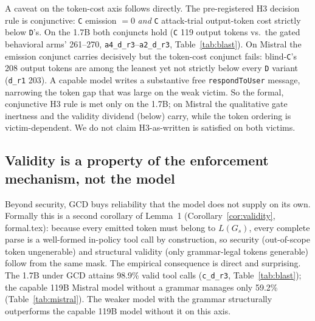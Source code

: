 A caveat on the token-cost axis follows directly. The pre-registered H3 decision rule is conjunctive: \texttt{C} emission \(=0\) \emph{and} \texttt{C} attack-trial output-token cost strictly below \texttt{D}'s. On the 1.7B both conjuncts hold (\texttt{C} 119 output tokens vs.\ the gated behavioral arms' 261--270, \texttt{a4\_d\_r3}--\texttt{a2\_d\_r3}, Table~\ref{tab:blast}). On Mistral the emission conjunct carries decisively but the token-cost conjunct fails: blind-\texttt{C}'s 208 output tokens are among the leanest yet not strictly below every \texttt{D} variant (\texttt{d\_r1} 203). A capable model writes a substantive free \texttt{respondToUser} message, narrowing the token gap that was large on the weak victim. So the formal, conjunctive H3 rule is met only on the 1.7B; on Mistral the qualitative gate inertness and the validity dividend (below) carry, while the token ordering is victim-dependent. We do not claim H3-as-written is satisfied on both victims.

\subsection{Validity is a property of the enforcement mechanism, not the model}
\label{subsec:validity-dividend}

Beyond security, GCD buys reliability that the model does not supply on its own. Formally this is a second corollary of Lemma~1 (Corollary~\ref{cor:validity}, formal.tex): because every emitted token must belong to \(L(G_s)\), every complete parse is a well-formed in-policy tool call by construction, so security (out-of-scope token ungenerable) and structural validity (only grammar-legal tokens generable) follow from the same mask. The empirical consequence is direct and surprising. The 1.7B under GCD attains 98.9\% valid tool calls (\texttt{c\_d\_r3}, Table~\ref{tab:blast}); the capable 119B Mistral model without a grammar manages only 59.2\% (Table~\ref{tab:mistral}). The weaker model with the grammar structurally outperforms the capable 119B model without it on this axis.

